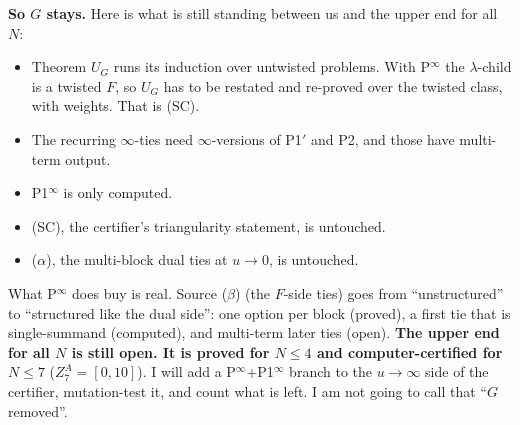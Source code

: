 \documentclass[10pt]{article}
\begin{document}
\textbf{So $G$ stays.} Here is what is still standing between us and the upper end for all $N$:
\begin{itemize}\itemsep0pt
\item Theorem $U_G$ runs its induction over untwisted problems. With P$^\infty$ the $\lambda$-child is a twisted $F$, so $U_G$ has to be restated and re-proved over the twisted class, with weights. That is (SC).
\item The recurring $\infty$-ties need $\infty$-versions of P1$'$ and P2, and those have multi-term output.
\item P1$^\infty$ is only computed.
\item (SC), the certifier's triangularity statement, is untouched.
\item ($\alpha$), the multi-block dual ties at $u\to0$, is untouched.
\end{itemize}
What P$^\infty$ does buy is real. Source ($\beta$) (the $F$-side ties) goes from ``unstructured'' to ``structured like the dual side'': one option per block (proved), a first tie that is single-summand (computed), and multi-term later ties (open).
\textbf{The upper end for all $N$ is still open. It is proved for $N\le4$ and computer-certified for $N\le7$} ($Z^A_7=[0,10]$).
I will add a P$^\infty$+P1$^\infty$ branch to the $u\to\infty$ side of the certifier, mutation-test it, and count what is left. I am not going to call that ``$G$ removed''.
\end{document}
